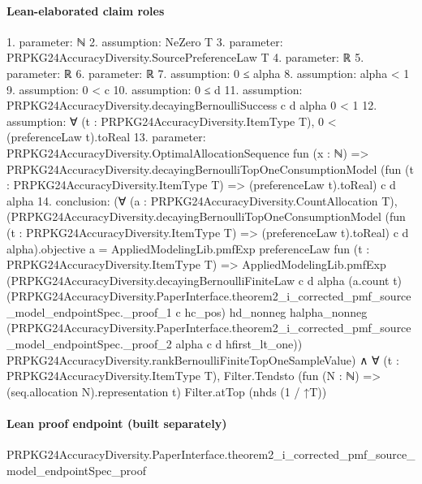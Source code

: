 \documentclass[10pt]{article}
\begin{document}
\paragraph{Lean-elaborated claim roles}\begin{ReviewVerbatim}
1. parameter: ℕ
2. assumption: NeZero T
3. parameter: PRPKG24AccuracyDiversity.SourcePreferenceLaw T
4. parameter: ℝ
5. parameter: ℝ
6. parameter: ℝ
7. assumption: 0 ≤ alpha
8. assumption: alpha < 1
9. assumption: 0 < c
10. assumption: 0 ≤ d
11. assumption: PRPKG24AccuracyDiversity.decayingBernoulliSuccess c d alpha 0 < 1
12. assumption: ∀ (t : PRPKG24AccuracyDiversity.ItemType T), 0 < (preferenceLaw t).toReal
13. parameter: PRPKG24AccuracyDiversity.OptimalAllocationSequence fun (x : ℕ) =>
  PRPKG24AccuracyDiversity.decayingBernoulliTopOneConsumptionModel
    (fun (t : PRPKG24AccuracyDiversity.ItemType T) => (preferenceLaw t).toReal) c d alpha
14. conclusion: (∀ (a : PRPKG24AccuracyDiversity.CountAllocation T),
    (PRPKG24AccuracyDiversity.decayingBernoulliTopOneConsumptionModel
            (fun (t : PRPKG24AccuracyDiversity.ItemType T) => (preferenceLaw t).toReal) c d alpha).objective
        a =
      AppliedModelingLib.pmfExp preferenceLaw fun (t : PRPKG24AccuracyDiversity.ItemType T) =>
        AppliedModelingLib.pmfExp
          (PRPKG24AccuracyDiversity.decayingBernoulliFiniteLaw c d alpha (a.count t)
            (PRPKG24AccuracyDiversity.PaperInterface.theorem2_i_corrected_pmf_source_model_endpointSpec._proof_1 c
              hc_pos)
            hd_nonneg halpha_nonneg
            (PRPKG24AccuracyDiversity.PaperInterface.theorem2_i_corrected_pmf_source_model_endpointSpec._proof_2 alpha c
              d hfirst_lt_one))
          PRPKG24AccuracyDiversity.rankBernoulliFiniteTopOneSampleValue) ∧
  ∀ (t : PRPKG24AccuracyDiversity.ItemType T),
    Filter.Tendsto (fun (N : ℕ) => (seq.allocation N).representation t) Filter.atTop (nhds (1 / ↑T))
\end{ReviewVerbatim}

\paragraph{Lean proof endpoint (built separately)}\begin{ReviewVerbatim}
PRPKG24AccuracyDiversity.PaperInterface.theorem2_i_corrected_pmf_source_model_endpointSpec_proof
\end{ReviewVerbatim}
\end{document}
